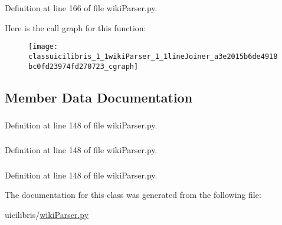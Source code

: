\-Definition at line 166 of file wiki\-Parser.\-py.



\-Here is the call graph for this function\-:
\nopagebreak
\begin{figure}[H]
\begin{center}
\leavevmode
\texttt{[image: classuicilibris\_1\_1wikiParser\_1\_1lineJoiner\_a3e2015b6de4918bc0fd23974fd270723\_cgraph]}
\end{center}
\end{figure}




\subsection{\-Member \-Data \-Documentation}
\hypertarget{classuicilibris_1_1wikiParser_1_1lineJoiner_a6f256454bdf66e5bc7092b2e5e35e309}{
\subsubsection[{encoding}]{}}\label{classuicilibris_1_1wikiParser_1_1lineJoiner_a6f256454bdf66e5bc7092b2e5e35e309}


\-Definition at line 148 of file wiki\-Parser.\-py.

\hypertarget{classuicilibris_1_1wikiParser_1_1lineJoiner_ac880296b5451530bdb53f9ee85f8d1ee}{
\subsubsection[{lines}]{}}\label{classuicilibris_1_1wikiParser_1_1lineJoiner_ac880296b5451530bdb53f9ee85f8d1ee}


\-Definition at line 148 of file wiki\-Parser.\-py.

\hypertarget{classuicilibris_1_1wikiParser_1_1lineJoiner_af17fcd2f320eca11d8d790d4842a4b7e}{
\subsubsection[{old\-Wiki2}]{}}\label{classuicilibris_1_1wikiParser_1_1lineJoiner_af17fcd2f320eca11d8d790d4842a4b7e}


\-Definition at line 148 of file wiki\-Parser.\-py.



\-The documentation for this class was generated from the following file\-:\begin{DoxyCompactItemize}
\item 
uicilibris/\hyperlink{wikiParser_8py}{wiki\-Parser.\-py}\end{DoxyCompactItemize}
